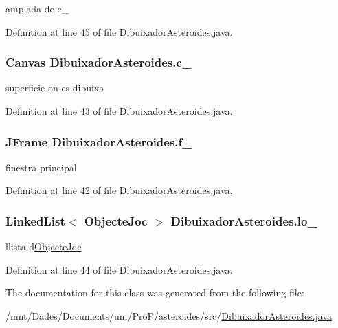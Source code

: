 amplada de c\+\_\+ 



Definition at line 45 of file Dibuixador\+Asteroides.\+java.

\hypertarget{class_dibuixador_asteroides_a634f3d95d02d08c9d21d2eef2c3bb410}{}
\subsubsection[{c\+\_\+}]{\setlength{\rightskip}{0pt plus 5cm}Canvas Dibuixador\+Asteroides.\+c\+\_\+\hspace{0.3cm}{\ttfamily [private]}}\label{class_dibuixador_asteroides_a634f3d95d02d08c9d21d2eef2c3bb410}


superficie on es dibuixa 



Definition at line 43 of file Dibuixador\+Asteroides.\+java.

\hypertarget{class_dibuixador_asteroides_acd1dc7eee6ddda629759fc422566b11b}{}
\subsubsection[{f\+\_\+}]{\setlength{\rightskip}{0pt plus 5cm}J\+Frame Dibuixador\+Asteroides.\+f\+\_\+\hspace{0.3cm}{\ttfamily [private]}}\label{class_dibuixador_asteroides_acd1dc7eee6ddda629759fc422566b11b}


finestra principal 



Definition at line 42 of file Dibuixador\+Asteroides.\+java.

\hypertarget{class_dibuixador_asteroides_aafc049ca18d07bf9cf5f61b7e8e1e06f}{}
\subsubsection[{lo\+\_\+}]{\setlength{\rightskip}{0pt plus 5cm}Linked\+List$<$ {\bf Objecte\+Joc} $>$ Dibuixador\+Asteroides.\+lo\+\_\+\hspace{0.3cm}{\ttfamily [private]}}\label{class_dibuixador_asteroides_aafc049ca18d07bf9cf5f61b7e8e1e06f}


llista d\textquotesingle{}\hyperlink{interface_objecte_joc}{Objecte\+Joc} 



Definition at line 44 of file Dibuixador\+Asteroides.\+java.



The documentation for this class was generated from the following file\+:\begin{DoxyCompactItemize}
\item 
/mnt/\+Dades/\+Documents/uni/\+Pro\+P/asteroides/src/\hyperlink{_dibuixador_asteroides_8java}{Dibuixador\+Asteroides.\+java}\end{DoxyCompactItemize}
